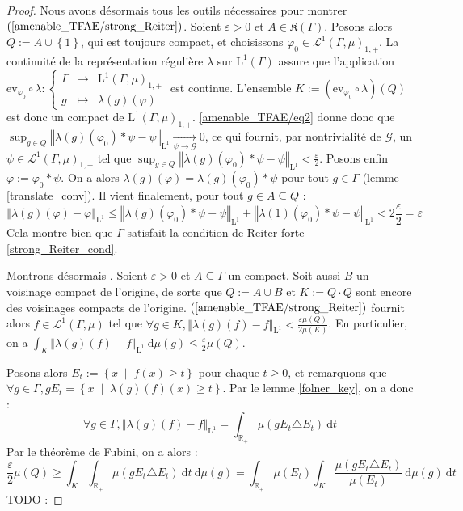 \documentclass[a4paper,12pt]{article}
\newcommand{\R}{\mathbb{R}}
\newcommand{\ev}{\mathrm{ev}}
\newcommand{\norm}[1]{\left\Vert #1\right\Vert}
\newcommand{\halfilon}{{\frac\varepsilon2}}
\newcommand{\set}[1]{\left\{ #1 \right\}}
\newcommand{\integral}[4]{\int_{#1}^{#2} #3~\mathrm{d}#4}
\newcommand\fundef[3]{#1: \left\{\begin{array}{ccc}#2\\#3\end{array}\right.}
\newcommand{\tq}{\;\middle|\;}
\newcommand{\comp}{\circ}
\renewcommand{\implies}{\Rightarrow}
\newcommand{\TODO}[1]{{\color{red}TODO :} #1}
\begin{document}
\begin{proof}
    Nous avons désormais tous les outils nécessaires pour montrer $(\ref{amenable_TFAE/strong_Reiter})$. Soient $\varepsilon>0$ et $A\in\mathfrak{K}(\Gamma)$.
    Posons alors $Q := A\cup\set{1}$, qui est toujours compact, et choisissons $\varphi_0\in\mathscr{L}^1(\Gamma, \mu)_{1, +}$. La continuité de la représentation régulière $\lambda$ sur 
    $\mathrm{L}^1(\Gamma)$ assure que l'application $\fundef{\ev_{\varphi_0}\comp\lambda}{\Gamma&\to&\mathrm{L}^1(\Gamma, \mu)_{1, +}}{g&\mapsto&\lambda(g)(\varphi)}$ est continue. 
    L'ensemble $K := (\ev_{\varphi_0}\comp\lambda)(Q)$ est donc un compact de $\mathrm{L}^1(\Gamma, \mu)_{1, +}$. \eqref{amenable_TFAE/eq2} donne donc 
    que $\sup_{g\in Q}\norm{\lambda(g)(\varphi_0)\ast\psi - \psi}_{\mathrm{L}^1} \xrightarrow[\psi\to\mathscr{G}]{} 0$, ce qui fournit, par nontrivialité 
    de $\mathscr{G}$, un $\psi\in\mathscr{L}^1(\Gamma, \mu)_{1, +}$ tel que $\sup_{g\in Q}\norm{\lambda(g)(\varphi_0)\ast\psi - \psi}_{\mathrm{L}^1} < \halfilon$. Posons enfin $\varphi := \varphi_0\ast\psi$.
    On a alors $\lambda(g)(\varphi) = \lambda(g)(\varphi_0)\ast\psi$ pour tout $g\in\Gamma$ (lemme \ref{translate_conv}). Il vient finalement, pour tout $g\in A\subseteq Q$ : 
    \begin{equation*}
        \norm{\lambda(g)(\varphi) - \varphi}_{\mathrm{L}^1} \leq    
            \norm{\lambda(g)(\varphi_0)\ast\psi - \psi}_{\mathrm{L}^1} + \norm{\lambda(1)(\varphi_0)\ast\psi - \psi}_{\mathrm{L}^1}
            < 2\halfilon = \varepsilon
    \end{equation*}
    Cela montre bien que $\Gamma$ satisfait la condition de Reiter forte \eqref{strong_Reiter_cond}.

    Montrons désormais \framebox{$(\ref{amenable_TFAE/strong_Reiter})\implies(\ref{amenable_TFAE/strong_Folner})$}. Soient $\varepsilon>0$
    et $A\subseteq\Gamma$ un compact. Soit aussi $B$ un voisinage compact de l'origine, de sorte que $Q := A\cup B$ et $K := Q\cdot Q$ sont encore des voisinages compacts de l'origine.
    $(\ref{amenable_TFAE/strong_Reiter})$ fournit alors $f\in\mathscr{L}^1(\Gamma, \mu)$ tel que $\forall g\in K, \norm{\lambda(g)(f) - f}_{\mathrm{L}^1} < \frac{\varepsilon\mu(Q)}{2\mu(K)}$.
    En particulier, on a $\integral{K}{}{\norm{\lambda(g)(f) - f}_{\mathrm{L}^1}}{\mu(g)} \leq \halfilon\mu(Q)$.

    Posons alors $E_t := \set{x\tq f(x)\geq t}$ pour chaque $t\geq0$, et remarquons que 
    $\forall g\in\Gamma, gE_t = \set{x\tq \lambda(g)(f)(x) \geq t}$. Par le lemme \ref{folner_key}, on a donc :
    \begin{equation*}
        \forall g\in\Gamma, \norm{\lambda(g)(f) - f}_{\mathrm{L}^1} = \integral{\R_+}{}{\mu(gE_t\triangle E_t)}{t}
    \end{equation*}
    Par le théorème de Fubini, on a alors :
    \begin{equation*}
        \halfilon\mu(Q) \geq \integral{K}{}{\integral{\R_+}{}{\mu(gE_t\triangle E_t)}{t}}{\mu(g)} = \integral{\R_+}{}{\mu(E_t)\integral{K}{}{\frac{\mu(gE_t\triangle E_t)}{\mu(E_t)}}{\mu(g)}}{t}
    \end{equation*}
    \TODO{}


\end{proof}
\end{document}
